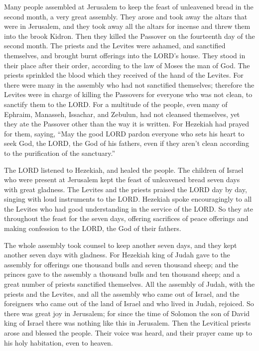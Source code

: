  Many people assembled at Jerusalem to keep the feast of
unleavened bread in the second month, a very great assembly.
 They arose and took away the altars that were in
Jerusalem, and they took away all the altars for incense and threw them
into the brook Kidron.  Then they killed the Passover on
the fourteenth day of the second month. The priests and the Levites were
ashamed, and sanctified themselves, and brought burnt offerings into the
LORD's house.  They stood in their place after their
order, according to the law of Moses the man of God. The priests
sprinkled the blood which they received of the hand of the Levites.
 For there were many in the assembly who had not
sanctified themselves; therefore the Levites were in charge of killing
the Passovers for everyone who was not clean, to sanctify them to the
LORD.  For a multitude of the people, even many of
Ephraim, Manasseh, Issachar, and Zebulun, had not cleansed themselves,
yet they ate the Passover other than the way it is written. For Hezekiah
had prayed for them, saying, ``May the good LORD pardon everyone
 who sets his heart to seek God, the LORD, the God of his
fathers, even if they aren't clean according to the purification of the
sanctuary.''

 The LORD listened to Hezekiah, and healed the people.
 The children of Israel who were present at Jerusalem
kept the feast of unleavened bread seven days with great gladness. The
Levites and the priests praised the LORD day by day, singing with loud
instruments to the LORD.  Hezekiah spoke encouragingly to
all the Levites who had good understanding in the service of the LORD.
So they ate throughout the feast for the seven days, offering sacrifices
of peace offerings and making confession to the LORD, the God of their
fathers.

 The whole assembly took counsel to keep another seven
days, and they kept another seven days with gladness. 
For Hezekiah king of Judah gave to the assembly for offerings one
thousand bulls and seven thousand sheep; and the princes gave to the
assembly a thousand bulls and ten thousand sheep; and a great number of
priests sanctified themselves.  All the assembly of
Judah, with the priests and the Levites, and all the assembly who came
out of Israel, and the foreigners who came out of the land of Israel and
who lived in Judah, rejoiced.  So there was great joy in
Jerusalem; for since the time of Solomon the son of David king of Israel
there was nothing like this in Jerusalem.  Then the
Levitical priests arose and blessed the people. Their voice was heard,
and their prayer came up to his holy habitation, even to heaven.

